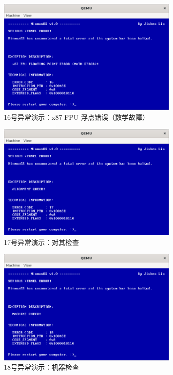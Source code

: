 \begin{figure}[htbp]
    \centering
    \includegraphics[width=0.8\textwidth]{figures/Exception16Presentation.png}
    \caption{16号异常演示：x87 FPU 浮点错误（数学故障）}
\end{figure}

\begin{figure}[htbp]
    \centering
    \includegraphics[width=0.8\textwidth]{figures/Exception17Presentation.png}
    \caption{17号异常演示：对其检查}
\end{figure}

\begin{figure}[htbp]
    \centering
    \includegraphics[width=0.8\textwidth]{figures/Exception18Presentation.png}
    \caption{18号异常演示：机器检查}
\end{figure}

